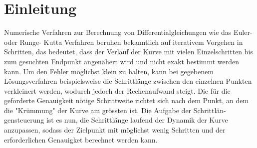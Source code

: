 %
%
%
\section{Einleitung\label{steps:section:einleitung}}

Numerische Verfahren zur Berechnung von Differentialgleichungen wie das Euler- oder Runge-
Kutta Verfahren beruhen bekanntlich auf iterativem Vorgehen in Schritten, das bedeutet, dass der Verlauf
der Kurve mit vielen Einzelschritten bis zum gesuchten Endpunkt angenähert wird und nicht exakt
bestimmt werden kann. Um den Fehler möglichst klein zu halten,
kann bei gegebenem Lösungsverfahren beispielsweise die Schrittlänge zwischen den einzelnen Punkten verkleinert werden, wodurch
jedoch der Rechenaufwand steigt. Die für die geforderte Genauigkeit nötige Schrittweite richtet sich
nach dem Punkt, an dem die "Krümmung" der Kurve am grössten ist. Die Aufgabe der Schrittlän-
gensteuerung ist es nun, die Schrittlänge laufend der Dynamik der Kurve anzupassen, sodass der
Zielpunkt mit möglichst wenig Schritten und der erforderlichen Genauigket berechnet werden
kann.

